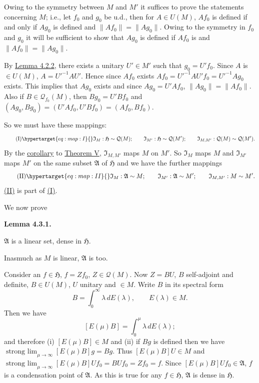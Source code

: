 \documentclass[twoside,leqno]{article}
\newcommand{\cH}{\mathfrak{H}}
\newcommand{\Q}{\mathcal{Q}}
\newcommand{\StatementTarget}[1]{\phantomsection\hypertarget{stmt:#1}{}}
\newcommand{\StatementRef}[2]{\hyperlink{stmt:#1}{#2}}
\newcommand{\EquationTarget}[1]{\hypertarget{eq:#1}{}}
\newcommand{\EquationRef}[2]{\hyperlink{eq:#1}{#2}}
\newenvironment{statement}[2]{%
  \par\medskip
  \noindent\StatementTarget{#1}\hspace*{\parindent}\textbf{#2.}\ \itshape\ignorespaces
}{\par}
\begin{document}
Owing to the symmetry between \(M\) and \(M'\) it suffices to prove the
statements concerning \(M\); i.e., let \(f_0\) and \(g_0\) be u.d., then for
\(A\in U(M)\), \(Af_0\) is defined if and only if \(Ag_0\) is defined and
\(\lVert Af_0\rVert=\lVert Ag_0\rVert\). Owing to the symmetry in \(f_0\)
and \(g_0\) it will be sufficient to show that \(Ag_0\) is defined if
\(Af_0\) is and \(\lVert Af_0\rVert=\lVert Ag_0\rVert\).

By \StatementRef{lem:4.2.2}{Lemma 4.2.2}, there exists a unitary
\(U'\in M'\) such that \(g_0=U'f_0\). Since \(A\) is \(\in U(M)\),
\(A=U'^{-1}AU'\). Hence since \(Af_0\) exists
\(Af_0=U'^{-1}AU'f_0=U'^{-1}Ag_0\)
exists. This implies that \(Ag_0\) exists and since \(Ag_0=U'Af_0\),
\(\lVert Ag_0\rVert=\lVert Af_0\rVert\). Also if
\(B\in\Q_{f_0}(M)\), then \(Bg_0=U'Bf_0\) and
\((Ag_0,Bg_0)=(U'Af_0,U'Bf_0)=(Af_0,Bf_0)\).

So we must have these mappings:
\[
 \tag{I}\EquationTarget{map:I}
 \mathfrak I_M:\cH\sim\Q(M);\qquad
 \mathfrak I_{M'}:\cH\sim\Q(M');\qquad
 \mathfrak I_{M,M'}:\Q(M)\sim\Q(M').
\]
By the \StatementRef{cor:V}{corollary} to \StatementRef{thm:V}{Theorem V},
\(\mathfrak I_{M,M'}\) maps \(M\) on \(M'\). So \(\mathfrak I_M\) maps
\(M\) and \(\mathfrak I_{M'}\) maps \(M'\) on the same subset
\(\mathfrak A\) of \(\cH\) and we have the further mappings
\[
 \tag{II}\EquationTarget{map:II}
 \mathfrak I_M:\mathfrak A\sim M;\qquad
 \mathfrak I_{M'}:\mathfrak A\sim M';\qquad
 \mathfrak I_{M,M'}:M\sim M'.
\]
\EquationRef{map:II}{(II)} is part of \EquationRef{map:I}{(I)}.

We now prove

\begin{statement}{lem:4.3.1}{Lemma 4.3.1}
\(\mathfrak A\) is a linear set, dense in \(\cH\).
\end{statement}

Inasmuch as \(M\) is linear, \(\mathfrak A\) is too.

Consider an \(f\in\cH\), \(f=Zf_0\), \(Z\in\Q(M)\). Now \(Z=BU\), \(B\)
self-adjoint and definite, \(B\in U(M)\), \(U\) unitary and \(\in M\).
Write \(B\) in its spectral form
\[
 B=\int_0^\infty \lambda\,dE(\lambda),\qquad E(\lambda)\in M.
\]
Then we have
\[
 [E(\mu)B]=\int_0^\mu \lambda\,dE(\lambda);
\]
and therefore (i) \([E(\mu)B]\in M\) and (ii) if \(Bg\) is defined then we
have
\(\mathop{\mathrm{strong}\ \lim}_{\mu\to\infty}\allowbreak[E(\mu)B]g\allowbreak=Bg\).
Thus \([E(\mu)B]U\in M\) and
\(\mathop{\mathrm{strong}\ \lim}_{\mu\to\infty}\allowbreak[E(\mu)B]Uf_0
\allowbreak=BUf_0\allowbreak=Zf_0\allowbreak=f\).
Since \([E(\mu)B]Uf_0\in\mathfrak A\), \(f\) is a condensation point of
\(\mathfrak A\). As this is true for any \(f\in\cH\), \(\mathfrak A\) is
dense in \(\cH\).
\end{document}
